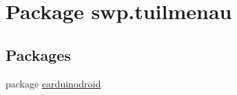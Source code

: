 \hypertarget{namespaceswp_1_1tuilmenau}{}\section{Package swp.\+tuilmenau}
\label{namespaceswp_1_1tuilmenau}
\subsection*{Packages}
\begin{DoxyCompactItemize}
\item 
package \hyperlink{namespaceswp_1_1tuilmenau_1_1carduinodroid}{carduinodroid}
\end{DoxyCompactItemize}
